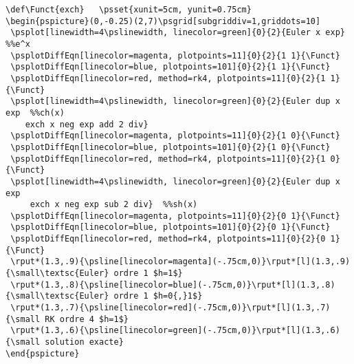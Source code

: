 \begin{lstlisting}[label={fig:minusexp}]
\def\Funct{exch}   \psset{xunit=5cm, yunit=0.75cm}
\begin{pspicture}(0,-0.25)(2,7)\psgrid[subgriddiv=1,griddots=10]
 \psplot[linewidth=4\pslinewidth, linecolor=green]{0}{2}{Euler x exp}  %%e^x
 \psplotDiffEqn[linecolor=magenta, plotpoints=11]{0}{2}{1 1}{\Funct}
 \psplotDiffEqn[linecolor=blue, plotpoints=101]{0}{2}{1 1}{\Funct}
 \psplotDiffEqn[linecolor=red, method=rk4, plotpoints=11]{0}{2}{1 1}{\Funct}
 \psplot[linewidth=4\pslinewidth, linecolor=green]{0}{2}{Euler dup x exp  %%ch(x)
    exch x neg exp add 2 div}
 \psplotDiffEqn[linecolor=magenta, plotpoints=11]{0}{2}{1 0}{\Funct}
 \psplotDiffEqn[linecolor=blue, plotpoints=101]{0}{2}{1 0}{\Funct}
 \psplotDiffEqn[linecolor=red, method=rk4, plotpoints=11]{0}{2}{1 0}{\Funct}
 \psplot[linewidth=4\pslinewidth, linecolor=green]{0}{2}{Euler dup x exp    
     exch x neg exp sub 2 div}  %%sh(x)
 \psplotDiffEqn[linecolor=magenta, plotpoints=11]{0}{2}{0 1}{\Funct}
 \psplotDiffEqn[linecolor=blue, plotpoints=101]{0}{2}{0 1}{\Funct}
 \psplotDiffEqn[linecolor=red, method=rk4, plotpoints=11]{0}{2}{0 1}{\Funct}
 \rput*(1.3,.9){\psline[linecolor=magenta](-.75cm,0)}\rput*[l](1.3,.9){\small\textsc{Euler} ordre 1 $h=1$}
 \rput*(1.3,.8){\psline[linecolor=blue](-.75cm,0)}\rput*[l](1.3,.8){\small\textsc{Euler} ordre 1 $h=0{,}1$}
 \rput*(1.3,.7){\psline[linecolor=red](-.75cm,0)}\rput*[l](1.3,.7){\small RK ordre 4 $h=1$}
 \rput*(1.3,.6){\psline[linecolor=green](-.75cm,0)}\rput*[l](1.3,.6){\small solution exacte}
\end{pspicture}
\end{lstlisting}

